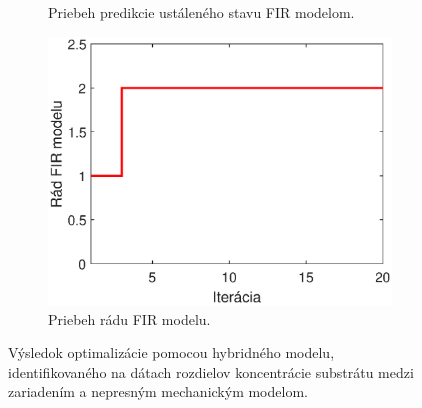 \begin{figure}
\begin{subfigure}[b]{0.49\textwidth}
		\caption{Priebeh predikcie ustáleného stavu FIR modelom. \newline}
		\label{fig:hybrid_sub_ss}
	\end{subfigure}
	\bigskip
	\begin{subfigure}[b]{0.49\textwidth}
		\centering
		\includegraphics[width=\linewidth]{images/hybrid_sub_order}
		\caption{Priebeh rádu FIR modelu.}
		\label{fig:hybrid_sub_order}
	\end{subfigure}
	\caption{Výsledok optimalizácie pomocou hybridného modelu, identifikovaného na dátach rozdielov koncentrácie substrátu medzi zariadením a nepresným mechanickým modelom.}
	\label{fig:hybrid_sub_opt_results}	
\end{figure}

